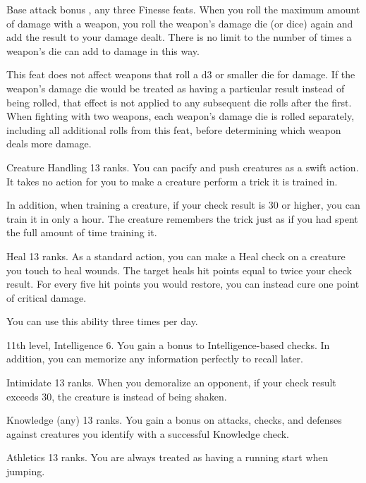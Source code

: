 \featpre Base attack bonus , any three Finesse feats.
\featben When you roll the maximum amount of damage with a weapon, you roll the weapon's damage die (or dice) again and add the result to your damage dealt. There is no limit to the number of times a weapon's die can add to damage in this way.

This feat does not affect weapons that roll a d3 or smaller die for damage. If the weapon's damage die would be treated as having a particular result instead of being rolled, that effect is not applied to any subsequent die rolls after the first. When fighting with two weapons, each weapon's damage die is rolled separately, including all additional rolls from this feat, before determining which weapon deals more damage.

\featpre Creature Handling 13 ranks.
\featben You can pacify and push creatures as a swift action. It takes no action for you to make a creature perform a trick it is trained in.

In addition, when training a creature, if your check result is 30 or higher, you can train it in only a hour. The creature remembers the trick just as if you had spent the full amount of time training it.

\featpre Heal 13 ranks.
\featben As a standard action, you can make a Heal check on a creature you touch to heal wounds. The target heals hit points equal to twice your check result. For every five hit points you would restore, you can instead cure one point of critical damage.

You can use this ability three times per day.

\featpre 11th level, Intelligence 6.
\featben You gain a  bonus to Intelligence-based checks. In addition, you can memorize any information perfectly to recall later.

\featpre Intimidate 13 ranks.
\featben When you demoralize an opponent, if your check result exceeds 30, the creature is \frightened instead of being shaken.

\featpre Knowledge (any) 13 ranks.
\featben You gain a  bonus on attacks, checks, and defenses against creatures you identify with a successful Knowledge check.

\featpre Athletics 13 ranks.
\featben You are always treated as having a running start when jumping.


